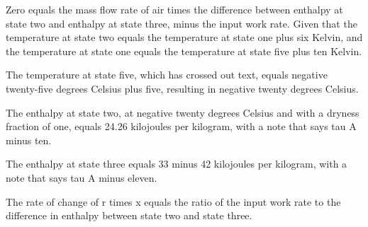 Zero equals the mass flow rate of air times the difference between enthalpy at state two and enthalpy at state three, minus the input work rate. Given that the temperature at state two equals the temperature at state one plus six Kelvin, and the temperature at state one equals the temperature at state five plus ten Kelvin.

The temperature at state five, which has crossed out text, equals negative twenty-five degrees Celsius plus five, resulting in negative twenty degrees Celsius.

The enthalpy at state two, at negative twenty degrees Celsius and with a dryness fraction of one, equals 24.26 kilojoules per kilogram, with a note that says tau A minus ten.

The enthalpy at state three equals 33 minus 42 kilojoules per kilogram, with a note that says tau A minus eleven.

The rate of change of r times x equals the ratio of the input work rate to the difference in enthalpy between state two and state three.